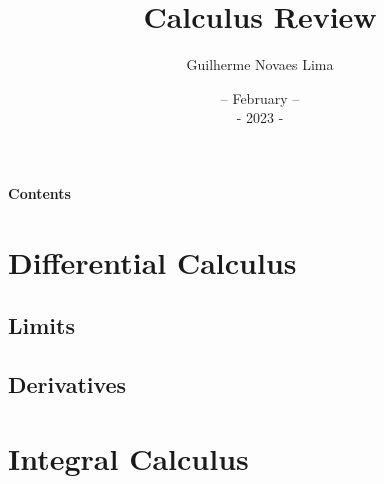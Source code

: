 \documentclass{article}
\title{Calculus Review}
\author{Guilherme Novaes Lima}
\date{--  February  --\\-  2023  -}
\begin{document}
\maketitle
\pagebreak
\begin{center}
\textbf{\Large Contents}
\end{center}
\renewcommand{\contentsname}{}
\vspace*{\fill}
\tableofcontents
\vspace*{\fill}
\pagebreak
\section{Differential Calculus}
\subsection{Limits}
\subsection{Derivatives}


\section{Integral Calculus}
\end{document}
